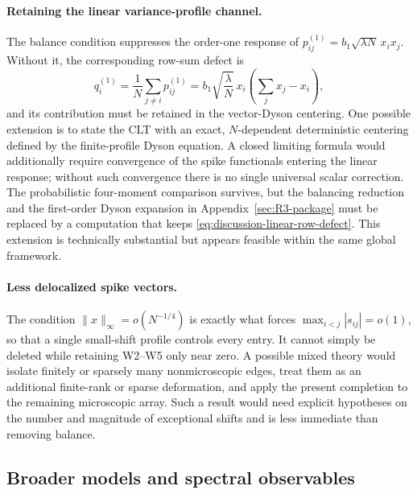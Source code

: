 \documentclass[11pt]{article}
\theoremstyle{definition}
\theoremstyle{remark}
\newcommand{\norm}[1]{\lVert #1\rVert}
\begin{document}
\paragraph*{Retaining the linear variance-profile channel.}
The balance condition suppresses the order-one response of
\(p_{ij}^{(1)}=b_1\sqrt{\lambda N}\,x_ix_j\).  Without it, the corresponding
row-sum defect is
\begin{equation}\label{eq:discussion-linear-row-defect}
 q_i^{(1)}
 =\frac1N\sum_{j\ne i}p_{ij}^{(1)}
 =b_1\sqrt{\frac{\lambda}{N}}\,x_i
   \left(\sum_jx_j-x_i\right),
\end{equation}
and its contribution must be retained in the vector-Dyson centering.  One
possible extension is to state the CLT with an exact, $N$-dependent
deterministic centering defined by the finite-profile Dyson equation.  A
closed limiting formula would additionally require convergence of the spike
functionals entering the linear response; without such convergence there is
no single universal scalar correction.  The probabilistic four-moment
comparison survives, but the balancing reduction and the first-order Dyson
expansion in Appendix~\ref{sec:R3-package} must be replaced by a computation
that keeps \eqref{eq:discussion-linear-row-defect}.  This extension is
technically substantial but appears feasible within the same global
framework.

\paragraph*{Less delocalized spike vectors.}
The condition \(\norm{x}_\infty=o(N^{-1/4})\) is exactly what forces
\(\max_{i<j}|s_{ij}|=o(1)\), so that a single small-shift profile controls every
entry.  It cannot simply be deleted while retaining W2--W5 only near zero.
A possible mixed theory would isolate finitely or sparsely many
nonmicroscopic edges, treat them as an additional finite-rank or sparse
deformation, and apply the present completion to the remaining microscopic
array.  Such a result would need explicit hypotheses on the number and
magnitude of exceptional shifts and is less immediate than removing balance.

\subsection{Broader models and spectral observables}
\label{subsec:discussion-models}
\end{document}

